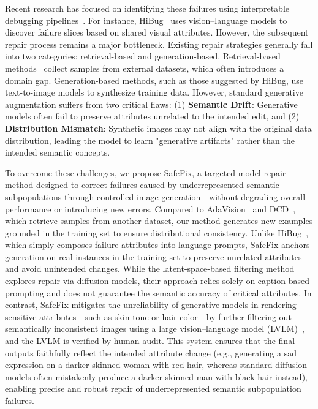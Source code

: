 \documentclass[10pt]{article} %
\newcommand{\model}{SafeFix\xspace}
\newcommand{\hibug}{HiBug\xspace}
\begin{document}
Recent research has focused on identifying these failures using interpretable debugging pipelines~\citep{gao2023adaptive,chen2023hibug,singla2024data}. For instance, \hibug~\citep{chen2023hibug} uses vision--language models to discover failure slices based on shared visual attributes. However, the subsequent repair process remains a major bottleneck. Existing repair strategies generally fall into two categories: retrieval-based and generation-based. Retrieval-based methods~\citep{gao2023adaptive,singla2024data} collect samples from external datasets, which often introduces a domain gap. Generation-based methods, such as those suggested by \hibug, use text-to-image models to synthesize training data. However, standard generative augmentation suffers from two critical flaws: (1) \textbf{Semantic Drift}: Generative models often fail to preserve attributes unrelated to the intended edit, and (2) \textbf{Distribution Mismatch}: Synthetic images may not align with the original data distribution, leading the model to learn "generative artifacts" rather than the intended semantic concepts.

To overcome these challenges, we propose \model, a targeted model repair method designed to correct failures caused by underrepresented semantic subpopulations through controlled image generation—without degrading overall performance or introducing new errors. Compared to AdaVision~\citep{gao2023adaptive} and DCD~\citep{singla2024data}, which retrieve samples from another dataset, our method generates new examples grounded in the training set to ensure distributional consistency. Unlike \hibug~\citep{chen2023hibug}, which simply composes failure attributes into language prompts, \model anchors generation on real instances in the training set to preserve unrelated attributes and avoid unintended changes. While the latent-space-based filtering method~\citep{jain2023latentfailures} explores repair via diffusion models, their approach relies solely on caption-based prompting and does not guarantee the semantic accuracy of critical attributes. In contrast, \model mitigates the unreliability of generative models in rendering sensitive attributes—such as skin tone or hair color—by further filtering out semantically inconsistent images using a large vision--language model (LVLM)~\citep{bai2025qwen25vl, liu2023improvedllava}, and the LVLM is verified by human audit. This  system ensures that the final outputs faithfully reflect the intended attribute change (e.g., generating a sad expression on a darker-skinned woman with red hair, whereas standard diffusion models often mistakenly produce a darker-skinned man with black hair instead), enabling precise and robust repair of underrepresented semantic subpopulation failures.
\end{document}
